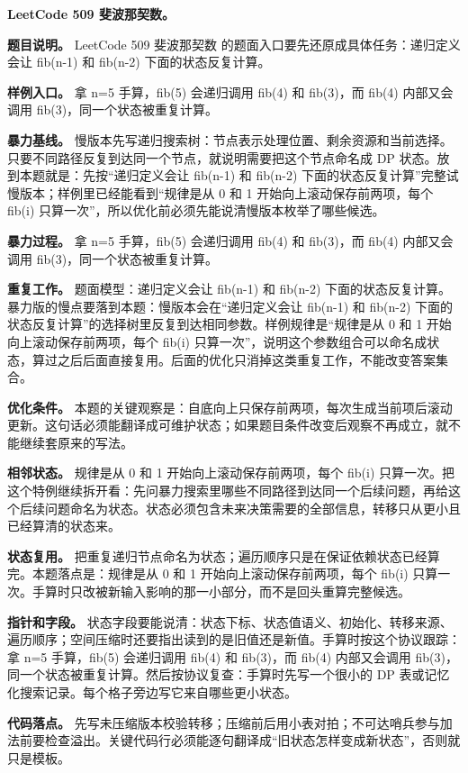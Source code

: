 \noindent\textbf{LeetCode 509 斐波那契数。}

\textbf{题目说明。} LeetCode 509 斐波那契数 的题面入口要先还原成具体任务：递归定义会让 fib(n-1) 和 fib(n-2) 下面的状态反复计算。

\textbf{样例入口。} 拿 n=5 手算，fib(5) 会递归调用 fib(4) 和 fib(3)，而 fib(4) 内部又会调用 fib(3)，同一个状态被重复计算。

\textbf{暴力基线。} 慢版本先写递归搜索树：节点表示处理位置、剩余资源和当前选择。只要不同路径反复到达同一个节点，就说明需要把这个节点命名成 DP 状态。放到本题就是：先按“递归定义会让 fib(n-1) 和 fib(n-2) 下面的状态反复计算”完整试慢版本；样例里已经能看到“规律是从 0 和 1 开始向上滚动保存前两项，每个 fib(i) 只算一次”，所以优化前必须先能说清慢版本枚举了哪些候选。

\textbf{暴力过程。} 拿 n=5 手算，fib(5) 会递归调用 fib(4) 和 fib(3)，而 fib(4) 内部又会调用 fib(3)，同一个状态被重复计算。

\textbf{重复工作。} 题面模型：递归定义会让 fib(n-1) 和 fib(n-2) 下面的状态反复计算。暴力版的慢点要落到本题：慢版本会在“递归定义会让 fib(n-1) 和 fib(n-2) 下面的状态反复计算”的选择树里反复到达相同参数。样例规律是“规律是从 0 和 1 开始向上滚动保存前两项，每个 fib(i) 只算一次”，说明这个参数组合可以命名成状态，算过之后后面直接复用。后面的优化只消掉这类重复工作，不能改变答案集合。

\textbf{优化条件。} 本题的关键观察是：自底向上只保存前两项，每次生成当前项后滚动更新。这句话必须能翻译成可维护状态；如果题目条件改变后观察不再成立，就不能继续套原来的写法。

\textbf{相邻状态。} 规律是从 0 和 1 开始向上滚动保存前两项，每个 fib(i) 只算一次。把这个特例继续拆开看：先问暴力搜索里哪些不同路径到达同一个后续问题，再给这个后续问题命名为状态。状态必须包含未来决策需要的全部信息，转移只从更小且已经算清的状态来。

\textbf{状态复用。} 把重复递归节点命名为状态；遍历顺序只是在保证依赖状态已经算完。本题落点是：规律是从 0 和 1 开始向上滚动保存前两项，每个 fib(i) 只算一次。手算时只改被新输入影响的那一小部分，而不是回头重算完整候选。

\textbf{指针和字段。} 状态字段要能说清：状态下标、状态值语义、初始化、转移来源、遍历顺序；空间压缩时还要指出读到的是旧值还是新值。手算时按这个协议跟踪：拿 n=5 手算，fib(5) 会递归调用 fib(4) 和 fib(3)，而 fib(4) 内部又会调用 fib(3)，同一个状态被重复计算。然后按协议复查：手算时先写一个很小的 DP 表或记忆化搜索记录。每个格子旁边写它来自哪些更小状态。

\textbf{代码落点。} 先写未压缩版本校验转移；压缩前后用小表对拍；不可达哨兵参与加法前要检查溢出。关键代码行必须能逐句翻译成“旧状态怎样变成新状态”，否则就只是模板。

